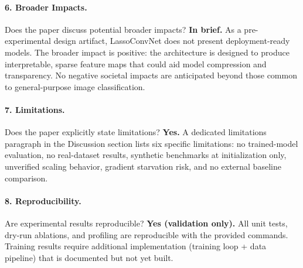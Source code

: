 \documentclass{article}
\begin{document}
\paragraph{6. Broader Impacts.}
Does the paper discuss potential broader impacts?
\textbf{In brief.} As a pre-experimental design artifact, LassoConvNet does
not present deployment-ready models. The broader impact is positive: the
architecture is designed to produce interpretable, sparse feature maps that
could aid model compression and transparency. No negative societal impacts
are anticipated beyond those common to general-purpose image classification.

\paragraph{7. Limitations.}
Does the paper explicitly state limitations?
\textbf{Yes.} A dedicated limitations paragraph in the Discussion section
lists six specific limitations: no trained-model evaluation, no real-dataset
results, synthetic benchmarks at initialization only, unverified scaling
behavior, gradient starvation risk, and no external baseline comparison.

\paragraph{8. Reproducibility.}
Are experimental results reproducible?
\textbf{Yes (validation only).} All unit tests, dry-run ablations, and
profiling are reproducible with the provided commands. Training results
require additional implementation (training loop + data pipeline) that is
documented but not yet built.
\end{document}
